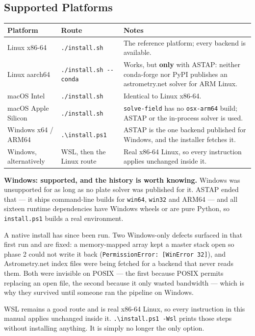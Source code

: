 \documentclass[11pt,a4paper]{article}
\begin{document}
\subsection{Supported Platforms}
\begin{center}
\begin{tabularx}{\textwidth}{|l|l|X|}
\hline
\textbf{Platform} & \textbf{Route} & \textbf{Notes} \\
\hline
Linux x86-64 & \texttt{./install.sh} & The reference platform; every backend is available. \\
\hline
Linux aarch64 & \texttt{./install.sh -{}-conda} & Works, but \textbf{only} with ASTAP: neither conda-forge nor PyPI publishes an astrometry.net solver for ARM Linux. \\
\hline
macOS Intel & \texttt{./install.sh} & Identical to Linux x86-64. \\
\hline
macOS Apple Silicon & \texttt{./install.sh} & \texttt{solve-field} has no \texttt{osx-arm64} build; ASTAP or the in-process solver is used. \\
\hline
Windows x64 / ARM64 & \texttt{.\textbackslash install.ps1} & ASTAP is the one backend published for Windows, and the installer fetches it. \\
\hline
Windows, alternatively & WSL, then the Linux route & Real x86-64 Linux, so every instruction applies unchanged inside it. \\
\hline
\end{tabularx}
\end{center}

\begin{mdframed}[backgroundcolor=procbg, linecolor=secondary, linewidth=1.5pt, roundcorner=4pt]
\textbf{Windows: supported, and the history is worth knowing.} Windows was
unsupported for as long as no plate solver was published for it. ASTAP ended
that --- it ships command-line builds for \texttt{win64}, \texttt{win32} and
ARM64 --- and all sixteen runtime dependencies have Windows wheels or are pure
Python, so \texttt{install.ps1} builds a real environment.

A native install has since been run. Two Windows-only defects surfaced in that
first run and are fixed: a memory-mapped array kept a master stack open so
phase 2 could not write it back
(\texttt{PermissionError: [WinError 32]}), and Astrometry.net index files were
being fetched for a backend that never reads them. Both were invisible on
POSIX --- the first because POSIX permits replacing an open file, the second
because it only wasted bandwidth --- which is why they survived until someone
ran the pipeline on Windows.

WSL remains a good route and is real x86-64 Linux, so every instruction in this
manual applies unchanged inside it. \texttt{.\textbackslash install.ps1 -Wsl}
prints those steps without installing anything. It is simply no longer the only
option.
\end{mdframed}
\end{document}
